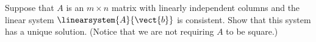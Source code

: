 Suppose that $A$ is an $m\times n$ matrix with linearly independent columns and the linear system $\linearsystem{A}{\vect{b}}$ is consistent.  Show that this system has a unique solution.  (Notice that we are not requiring $A$ to be square.)